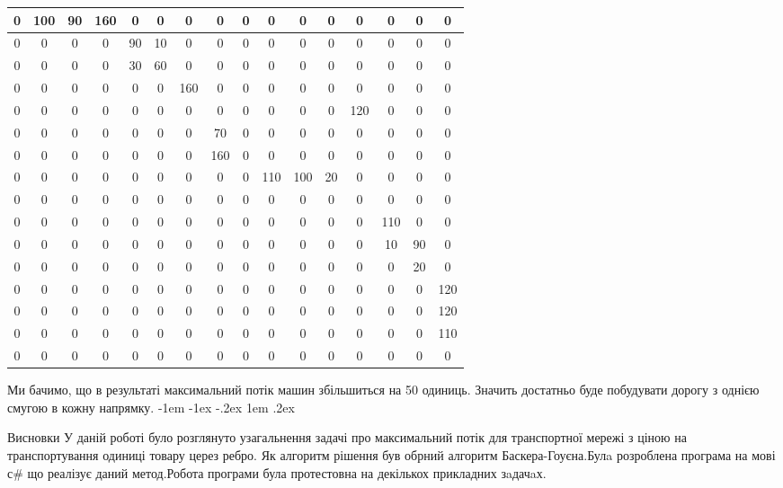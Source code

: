 \documentclass[a4paper,14pt,russian,ukrainian,oneside,final]{extreport}
\makeatletter
\newlength{\fivecharsapprox}
\newlength{\fivecharsapproxs}
\renewcommand\section{%
  \clearpage\@startsection {section}{0}%
    {\fivecharsapproxs}%
    {-1em \@plus -1ex \@minus -.2ex}%
    {1em \@plus .2ex}%
    {\raggedright\hyphenpenalty=10000\normalfont\large\bfseries\MakeUppercase {}}
}
\newcommand\sectioncentered{%
  \clearpage\@startsection {section}{1}%
    {\z@}%
    {-1em \@plus -1ex \@minus -.2ex}%
    {1em \@plus .2ex}%
    {\centering\hyphenpenalty=10000\normalfont\large\bfseries\MakeUppercase}%
    }
\makeatother
\begin{document}
\begin{center}
\begin{tabular}{|c|c|c|c|c|c|c|c|c|c|c|c|c|c|c|c|}
\hline
0&100&90&160&0&0&0&0&0&0&0&0&0&0&0&0 \\ \hline
0&0&0&0&90&10&0&0&0&0&0&0&0&0&0&0 \\ \hline
0&0&0&0&30&60&0&0&0&0&0&0&0&0&0&0 \\ \hline
0&0&0&0&0&0&160&0&0&0&0&0&0&0&0&0 \\ \hline
0&0&0&0&0&0&0&0&0&0&0&0&120&0&0&0 \\ \hline
0&0&0&0&0&0&0&70&0&0&0&0&0&0&0&0 \\ \hline
0&0&0&0&0&0&0&160&0&0&0&0&0&0&0&0 \\ \hline
0&0&0&0&0&0&0&0&0&110&100&20&0&0&0&0 \\ \hline
0&0&0&0&0&0&0&0&0&0&0&0&0&0&0&0 \\ \hline
0&0&0&0&0&0&0&0&0&0&0&0&0&110&0&0 \\ \hline
0&0&0&0&0&0&0&0&0&0&0&0&0&10&90&0 \\ \hline
0&0&0&0&0&0&0&0&0&0&0&0&0&0&20&0 \\ \hline
0&0&0&0&0&0&0&0&0&0&0&0&0&0&0&120 \\ \hline
0&0&0&0&0&0&0&0&0&0&0&0&0&0&0&120 \\ \hline
0&0&0&0&0&0&0&0&0&0&0&0&0&0&0&110 \\ \hline
0&0&0&0&0&0&0&0&0&0&0&0&0&0&0&0 \\
\hline
\end{tabular}
\end{center}
Ми бачимо, що в результаті максимальний потік машин збільшиться на 50 одиниць. Значить достатньо буде побудувати дорогу з однією смугою в кожну напрямку.
\newpage
\section{Висновки}
У даній роботі було розглянуто узагальнення задачі про максимальний потік для транспортної мережі з ціною на транспортування одиниці товару церез ребро. Як алгоритм рішення був обрний алгоритм Баскера-Гоуєна.Булa розроблена програма на мові с\# що реалізує даний метод.Робота програми була протестовна на декількох прикладних зaдачaх.

\newpage
\renewcommand{\bibsection}{\sectioncentered*{Cписок використанної літератури}}
\end{document}
